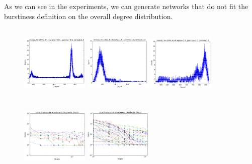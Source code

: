 As we can see in the experiments, we can generate networks that do not fit the burstiness definition on the overall degree distribution.

\begin{figure}[h]
	\centering
	
	\includegraphics[width=3.2cm, height=3.7cm]{img/M_g_peaks/figure_1}
	\endminipage
	\includegraphics[width=3.2cm, height=3.7cm]{img/M_g_power_law/figure_1}
	\endminipage
	\includegraphics[width=3.2cm, height=3.7cm]{img/M_g_regular/figure_1}
	\endminipage
		\vspace{-0.4cm}
	\includegraphics[width=3.2cm, height=3.7cm]{img/M_g_peaks/figure_3}
	\endminipage
	\includegraphics[width=3.2cm, height=3.7cm]{img/M_g_power_law/figure_3} 

\end{figure}
